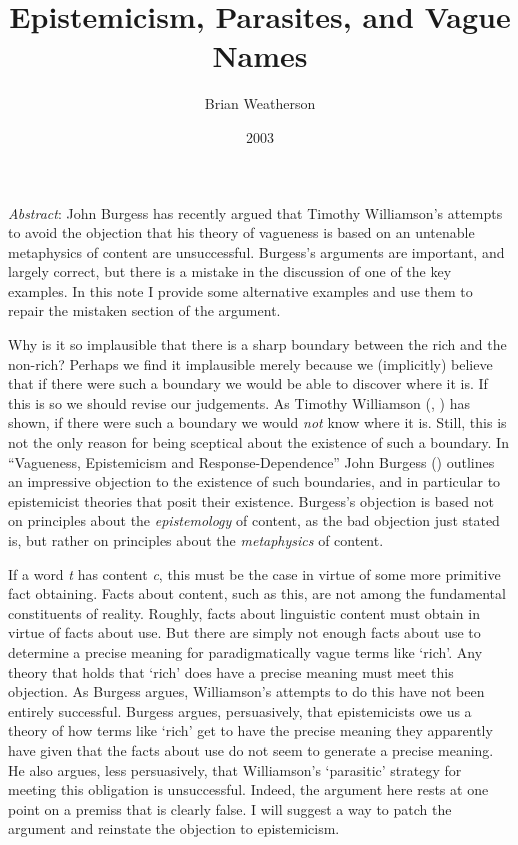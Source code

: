 \documentclass[
  11pt,
  letterpaper,
  DIV=11,
  numbers=noendperiod,
  twoside]{scrartcl}
\title{Epistemicism, Parasites, and Vague Names}
\author{Brian Weatherson}
\date{2003}
\renewenvironment{abstract}
 {\vspace{-1.25cm}
 \quotation\small\noindent\emph{Abstract}:}
 {\endquotation}
\begin{document}
\maketitle
\begin{abstract}
John Burgess has recently argued that Timothy Williamson's attempts to
avoid the objection that his theory of vagueness is based on an
untenable metaphysics of content are unsuccessful. Burgess's arguments
are important, and largely correct, but there is a mistake in the
discussion of one of the key examples. In this note I provide some
alternative examples and use them to repair the mistaken section of the
argument.
\end{abstract}


Why is it so implausible that there is a sharp boundary between the rich
and the non-rich? Perhaps we find it implausible merely because we
(implicitly) believe that if there were such a boundary we would be able
to discover where it is. If this is so we should revise our judgements.
As Timothy Williamson (,
) has shown, if there were
such a boundary we would \emph{not} know where it is. Still, this is not
the only reason for being sceptical about the existence of such a
boundary. In ``Vagueness, Epistemicism and Response-Dependence'' John
Burgess () outlines an impressive
objection to the existence of such boundaries, and in particular to
epistemicist theories that posit their existence. Burgess's objection is
based not on principles about the \emph{epistemology} of content, as the
bad objection just stated is, but rather on principles about the
\emph{metaphysics} of content.

If a word \emph{t} has content \emph{c}, this must be the case in virtue
of some more primitive fact obtaining. Facts about content, such as
this, are not among the fundamental constituents of reality. Roughly,
facts about linguistic content must obtain in virtue of facts about use.
But there are simply not enough facts about use to determine a precise
meaning for paradigmatically vague terms like `rich'. Any theory that
holds that `rich' does have a precise meaning must meet this objection.
As Burgess argues, Williamson's attempts to do this have not been
entirely successful. Burgess argues, persuasively, that epistemicists
owe us a theory of how terms like `rich' get to have the precise meaning
they apparently have given that the facts about use do not seem to
generate a precise meaning. He also argues, less persuasively, that
Williamson's `parasitic' strategy for meeting this obligation is
unsuccessful. Indeed, the argument here rests at one point on a premiss
that is clearly false. I will suggest a way to patch the argument and
reinstate the objection to epistemicism.
\end{document}
